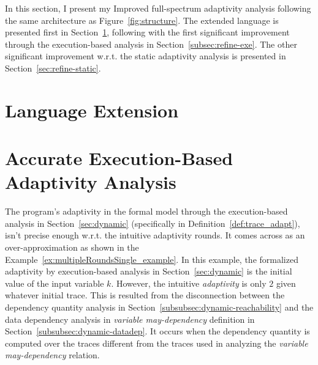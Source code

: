 In this section, I present my 
Improved full-spectrum adaptivity analysis 
following the same architecture as Figure~\ref{fig:structure}.
The extended language is presented first in Section~\ref{subsec:refine-exe-language},
following with the first significant improvement
through the execution-based analysis in Section~\ref{subsec:refine-exe}.
The other significant improvement w.r.t. the 
static adaptivity analysis is presented in Section~\ref{sec:refine-static}.
%
\section{Language Extension}
\label{subsec:refine-exe-language}


\section{Accurate Execution-Based Adaptivity Analysis}
\label{sec:refine-exe}
%
% 
The program's adaptivity in the formal model through the execution-based analysis in Section~\ref{sec:dynamic}
(specifically in Definition~\ref{def:trace_adapt}), isn't precise enough w.r.t. the intuitive adaptivity rounds.
It comes across as an over-approximation 
as shown in the Example~\ref{ex:multipleRoundsSingle_example}.
In this example, the formalized adaptivity by execution-based analysis in Section~\ref{sec:dynamic} 
is the initial value of the input variable $k$.
However, the intuitive \emph{adaptivity} is only $2$ given whatever initial trace.
This is resulted from the
disconnection between the 
dependency quantity analysis in Section~\ref{subsubsec:dynamic-reachability} and 
the data dependency analysis in \emph{variable may-dependency} definition in Section~\ref{subsubsec:dynamic-datadep}.
It occurs when the 
dependency quantity is computed over the traces different from the traces used in 
analyzing the \emph{variable may-dependency} relation.


